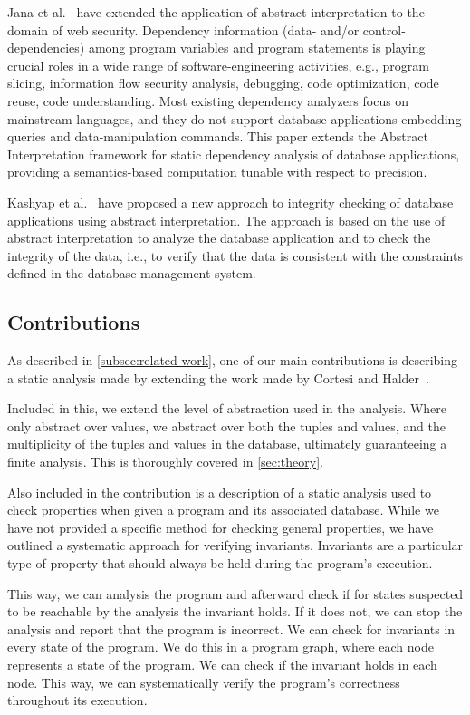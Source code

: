 Jana et al.~\cite{jana_extending_2020} have extended the application of abstract interpretation to the domain of web security.
Dependency information (data- and/or control-dependencies) among program variables and program statements is playing crucial roles in a wide range of software-engineering activities, e.g., program slicing, information flow security analysis, debugging, code optimization, code reuse, code understanding.
Most existing dependency analyzers focus on mainstream languages, and they do not support database applications embedding queries and data-manipulation commands.
This paper extends the Abstract Interpretation framework for static dependency analysis of database applications, providing a semantics-based computation tunable with respect to precision.

Kashyap et al.~\cite{kashyap_integrity_2022} have proposed a new approach to integrity checking of database applications using abstract interpretation.
The approach is based on the use of abstract interpretation to analyze the database application and to check the integrity of the data, i.e., to verify that the data is consistent with the constraints defined in the database management system.


\subsection{Contributions}\label{subsec:contributions}
As described in \autoref{subsec:related-work}, one of our main contributions is describing a static analysis made by extending the work made by Cortesi and Halder~\cite{halder_abstract_2012}.

Included in this, we extend the level of abstraction used in the analysis.
Where~\cite{halder_abstract_2012} only abstract over values, we abstract over both the tuples and values, and the multiplicity of the tuples and values in the database, ultimately guaranteeing a finite analysis.
This is thoroughly covered in \autoref{sec:theory}.

Also included in the contribution is a description of a static analysis used to check properties when given a program and its associated database.
While we have not provided a specific method for checking general properties, we have outlined a systematic approach for verifying invariants.
Invariants are a particular type of property that should always be held during the program's execution.

This way, we can analysis the program and afterward check if for states suspected to be reachable by the analysis the invariant holds.
If it does not, we can stop the analysis and report that the program is incorrect.
We can check for invariants in every state of the program.
We do this in a program graph, where each node represents a state of the program.
We can check if the invariant holds in each node.
This way, we can systematically verify the program's correctness throughout its execution.

